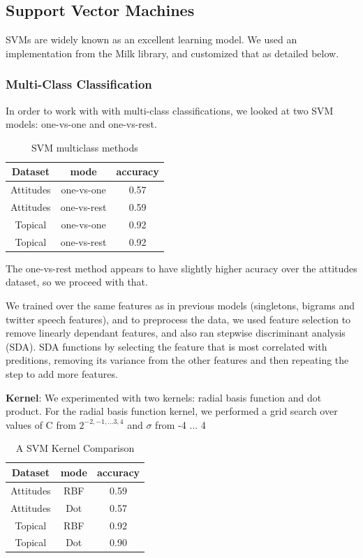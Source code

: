 \documentclass[fontsize=10pt,twocolumn,letterpaper,abstracton]{scrartcl}
\begin{document}
\subsection{Support Vector Machines}

SVMs are widely known as an excellent learning model. We used an implementation from the Milk\cite{milk} library, and customized that as detailed below. 

\subsubsection{Multi-Class Classification}

In order to work with with multi-class classifications, we looked at two SVM models: one-vs-one and one-vs-rest.

\begin{table}[H]
\centering
\begin{tabular}{ c | c | c}
Dataset & mode & accuracy\\
\hline
Attitudes & one-vs-one & 0.57 \\
Attitudes & one-vs-rest & 0.59 \\
Topical & one-vs-one & 0.92 \\
Topical & one-vs-rest & 0.92 \\
\end{tabular}
\caption{SVM multiclass methods}
\label{tb:svm-method}
\end{table}

The one-vs-rest method appears to have slightly higher acuracy over the attitudes dataset, so we proceed with that.

We trained over the same features as in previous models (singletons, bigrams and twitter speech features), and to preprocess the data, we used feature selection to remove linearly dependant features, and also ran stepwise discriminant analysis (SDA). SDA functions by selecting the feature that is most correlated with preditions, removing its variance from the other features and then repeating the step to add more features. 


\textbf{Kernel}:
We experimented with two kernels: radial basis function and dot product.  For the radial basis function kernel, we performed a grid search over values of C from $2^{-2, -1, ... 3, 4}$ and $\sigma$ from -4 ... 4

\begin{table}[H]
\centering
\begin{tabular}{ c | c | c}
Dataset & mode & accuracy\\
\hline
Attitudes & RBF & 0.59 \\
Attitudes & Dot & 0.57 \\
Topical & RBF & 0.92 \\
Topical & Dot & 0.90 \\
\end{tabular}
\caption{A SVM Kernel Comparison}
\label{tb:nb-inf}
\end{table}
\end{document}
